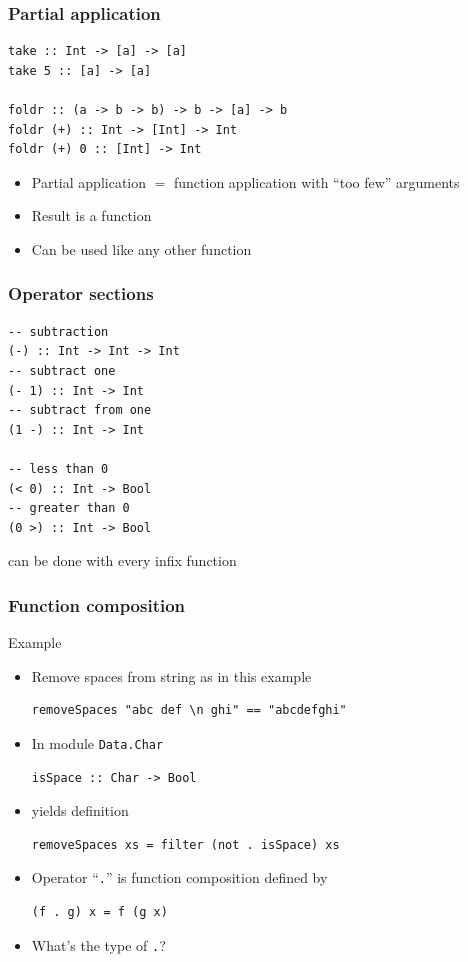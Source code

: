 \documentclass{beamer}
\begin{document}
\begin{frame}[fragile]
  \frametitle{Partial application}
\begin{verbatim}
take :: Int -> [a] -> [a]
take 5 :: [a] -> [a]

foldr :: (a -> b -> b) -> b -> [a] -> b
foldr (+) :: Int -> [Int] -> Int
foldr (+) 0 :: [Int] -> Int
\end{verbatim}
  \begin{itemize}
  \item Partial application $=$ function application with ``too few'' arguments
  \item Result is a function
  \item Can be used like any other function
  \end{itemize}
\end{frame}
\begin{frame}[fragile]
  \frametitle{Operator sections}
\begin{verbatim}
-- subtraction
(-) :: Int -> Int -> Int
-- subtract one
(- 1) :: Int -> Int
-- subtract from one
(1 -) :: Int -> Int

-- less than 0
(< 0) :: Int -> Bool
-- greater than 0
(0 >) :: Int -> Bool
\end{verbatim}
  can be done with every infix function
\end{frame}
\begin{frame}[fragile]
  \frametitle{Function composition}
  \begin{block}{Example}
    \begin{itemize}
    \item<+-> Remove spaces from string as in this
      example
\begin{verbatim}
removeSpaces "abc def \n ghi" == "abcdefghi"
\end{verbatim}
    \item<+-> In module \texttt{Data.Char}
\begin{verbatim}
isSpace :: Char -> Bool
\end{verbatim}
    \item<+-> yields definition
\begin{verbatim}
removeSpaces xs = filter (not . isSpace) xs
\end{verbatim}
    \item<+-> Operator ``\texttt{.}'' is function composition defined by
\begin{verbatim}
(f . g) x = f (g x)
\end{verbatim}
    \item<+-> What's the type of \texttt{.}?
    \end{itemize}
  \end{block}
\end{frame}
\end{document}

